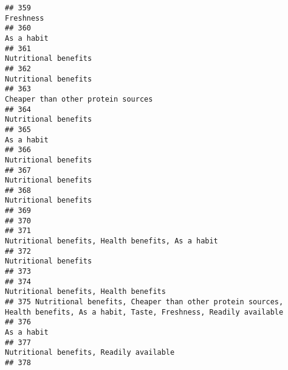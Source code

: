 \documentclass[
]{article}
\begin{document}
\begin{verbatim}
## 359                                                                                                                  Freshness
## 360                                                                                                                 As a habit
## 361                                                                                                       Nutritional benefits
## 362                                                                                                       Nutritional benefits
## 363                                                                                         Cheaper than other protein sources
## 364                                                                                                       Nutritional benefits
## 365                                                                                                                 As a habit
## 366                                                                                                       Nutritional benefits
## 367                                                                                                       Nutritional benefits
## 368                                                                                                       Nutritional benefits
## 369                                                                                                                           
## 370                                                                                                                           
## 371                                                                          Nutritional benefits, Health benefits, As a habit
## 372                                                                                                       Nutritional benefits
## 373                                                                                                                           
## 374                                                                                      Nutritional benefits, Health benefits
## 375 Nutritional benefits, Cheaper than other protein sources, Health benefits, As a habit, Taste, Freshness, Readily available
## 376                                                                                                                 As a habit
## 377                                                                                    Nutritional benefits, Readily available
## 378                                                                                                                           

\end{verbatim}
\end{document}
